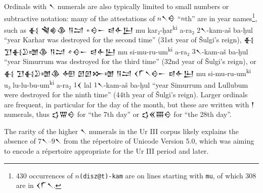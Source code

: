 \documentclass[10pt, a4paper, twoside]{article}
\begin{document}
Ordinals with {\xsuxfont 𒀹} numerals are also typically limited to small numbers
or subtractive notation:
many of the attestations of {\xsuxfont $n$𒀹𒄰} ``$n$th''
are in year names\footnote{430 occurrences of \texttt{$n$(disz@t)-kam}
are on lines starting with \texttt{mu}, of which 308 are in {\xsuxfont 𒌋𒇲𒀹}.}, such as
{\xsuxfont 𒈬 𒃸𒄯𒆠 𒀀𒁺 𒑊𒄰𒀸 𒁀𒅆𒌨}
mu kar₂-ḫar\textsuperscript{ki} a-ra₂ $2${\xsuxfont 𒀹}-kam-aš ba-ḫul
``year Karhar was destroyed for the second time'' (31st year of Šulgi’s reign),
{\xsuxfont 𒈬 𒋛𒈬𒊒𒌝𒆠 𒀀𒁺 𒑋𒄰𒀸 𒁀𒅆𒌨} mu si-mu-ru-um\textsuperscript{ki} a-ra₂ $3${\xsuxfont 𒀹}-kam-aš ba-ḫul
``year Simurrum was destroyed for the third time'' (32nd year of Šulgi’s reign), or
{\xsuxfont 𒈬 𒋛𒈬𒊒𒌝𒆠 𒅇 𒇻𒇻𒁍𒌝 𒀀𒁺 𒌋𒇲𒀹𒄰𒀸 𒁀𒅆𒌨}
mu si-mu-ru-um\textsuperscript{ki} u₃ lu-lu-bu-um\textsuperscript{ki} a-ra₂ $1${\xsuxfont 𒌋} lal $1${\xsuxfont 𒀹}-kam-aš
ba-ḫul ``year Simurrum and Lullubum were destroyed for the ninth time'' (44th year of Šulgi’s reign).
Larger ordinals are frequent, in particular for the day of the month, but these are written with
{\xsuxfont 𒁹} numerals, thus {\xsuxfont 𒌓𒐌𒄰} for ``the 7th day'' or {\xsuxfont 𒌓𒎙𒐍𒄰} for ``the 28th day''.

The rarity of the higher {\xsuxfont 𒀹} numerals in the Ur III corpus
likely explains the absence of $7${\xsuxfont 𒀹}--$9${\xsuxfont 𒀹}
from the répertoire of Unicode Version 5.0,
which was aiming to encode a répertoire appropriate for the Ur III period
and later.
\end{document}

